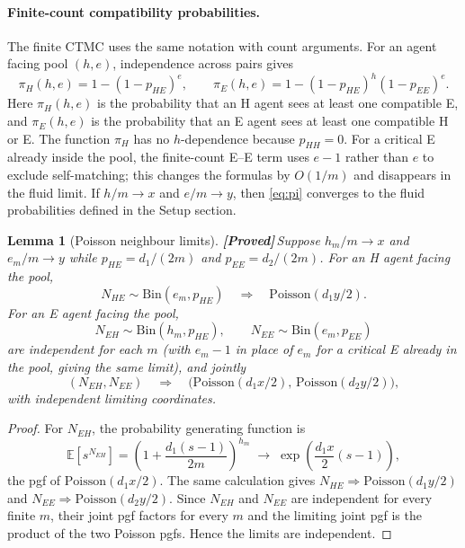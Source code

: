 \documentclass{article}
\theoremstyle{plain}
\newtheorem{lemma}{Lemma}
\theoremstyle{definition}
\newcommand{\E}{\mathbb{E}}
\newcommand{\proved}{\textcolor{provedgreen}{\textbf{[Proved]}}\,}
\begin{document}
\paragraph{Finite-count compatibility probabilities.}
The finite CTMC uses the same notation with count arguments. For an agent facing pool $(h,e)$, independence across pairs gives
\begin{equation}\label{eq:pi}
\pi_H(h,e)=1-(1-p_{HE})^e,\qquad \pi_E(h,e)=1-(1-p_{HE})^h(1-p_{EE})^e.
\end{equation}
Here $\pi_H(h,e)$ is the probability that an H agent sees at least one compatible E, and $\pi_E(h,e)$ is the probability that an E agent sees at least one compatible H or E. The function $\pi_H$ has no $h$-dependence because $p_{HH}=0$. For a critical E already inside the pool, the finite-count E--E term uses $e-1$ rather than $e$ to exclude self-matching; this changes the formulas by $O(1/m)$ and disappears in the fluid limit. If $h/m\to x$ and $e/m\to y$, then \eqref{eq:pi} converges to the fluid probabilities defined in the Setup section.

\begin{lemma}[Poisson neighbour limits]\label{lem:poisson-neighbour}
\proved Suppose $h_m/m\to x$ and $e_m/m\to y$ while $p_{HE}=d_1/(2m)$ and $p_{EE}=d_2/(2m)$. For an H agent facing the pool,
\[
N_{HE}\sim \mathrm{Bin}(e_m,p_{HE})
\quad\Longrightarrow\quad
\mathrm{Poisson}(d_1y/2).
\]
For an E agent facing the pool,
\[
N_{EH}\sim \mathrm{Bin}(h_m,p_{HE}),\qquad
N_{EE}\sim \mathrm{Bin}(e_m,p_{EE})
\]
are independent for each $m$ (with $e_m-1$ in place of $e_m$ for a critical E already in the pool, giving the same limit), and jointly
\[
(N_{EH},N_{EE})
\quad\Longrightarrow\quad
\bigl(\mathrm{Poisson}(d_1x/2),\,\mathrm{Poisson}(d_2y/2)\bigr),
\]
with independent limiting coordinates.
\end{lemma}

\begin{proof}
For $N_{EH}$, the probability generating function is
\[
\E[s^{N_{EH}}]
=\left(1+\frac{d_1(s-1)}{2m}\right)^{h_m}
\;\longrightarrow\;
\exp\!\left(\frac{d_1x}{2}(s-1)\right),
\]
the pgf of $\mathrm{Poisson}(d_1x/2)$. The same calculation gives $N_{HE}\Rightarrow\mathrm{Poisson}(d_1y/2)$ and $N_{EE}\Rightarrow\mathrm{Poisson}(d_2y/2)$. Since $N_{EH}$ and $N_{EE}$ are independent for every finite $m$, their joint pgf factors for every $m$ and the limiting joint pgf is the product of the two Poisson pgfs. Hence the limits are independent.
\end{proof}
\end{document}
